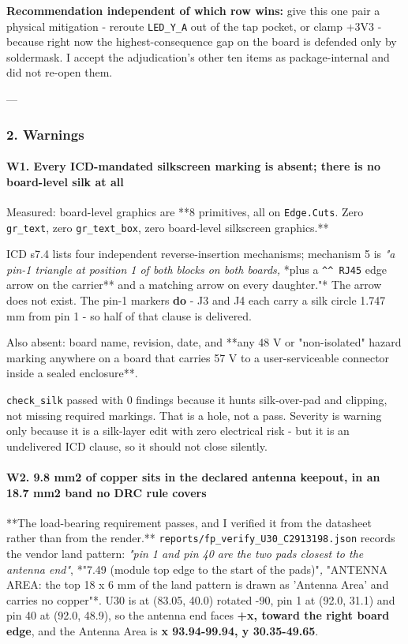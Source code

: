 \documentclass[11pt,a4paper]{article}
\begin{document}
\textbf{Recommendation independent of which row wins:} give this one pair a physical mitigation - reroute \texttt{LED\_Y\_A} out of the tap pocket, or clamp +3V3 - because right now the highest-consequence gap on the board is defended only by soldermask. I accept the adjudication's other ten items as package-internal and did not re-open them.

---

\subsubsection*{2. Warnings}
\paragraph*{W1. Every ICD-mandated silkscreen marking is absent; there is no board-level silk at all}
Measured: board-level graphics are {*}{*}8 primitives, all on \texttt{Edge.Cuts}. Zero \texttt{gr\_text}, zero \texttt{gr\_text\_box}, zero board-level silkscreen graphics.{*}{*}

ICD s7.4 lists four independent reverse-insertion mechanisms; mechanism 5 is \emph{"a pin-1 triangle at position 1 of both blocks on both boards, }{*}plus a \texttt{\textasciicircum{}\textasciicircum{} RJ45} edge arrow on the carrier{*}{*} and a matching arrow on every daughter."{*} The arrow does not exist. The pin-1 markers \textbf{do} - J3 and J4 each carry a silk circle 1.747 mm from pin 1 - so half of that clause is delivered.

Also absent: board name, revision, date, and {*}{*}any 48 V or "non-isolated" hazard marking anywhere on a board that carries 57 V to a user-serviceable connector inside a sealed enclosure{*}{*}.

\texttt{check\_silk} passed with 0 findings because it hunts silk-over-pad and clipping, not missing required markings. That is a hole, not a pass. Severity is warning only because it is a silk-layer edit with zero electrical risk - but it is an undelivered ICD clause, so it should not close silently.

\paragraph*{W2. 9.8 mm2 of copper sits in the declared antenna keepout, in an 18.7 mm2 band no DRC rule covers}
{*}{*}The load-bearing requirement passes, and I verified it from the datasheet rather than from the render.{*}{*} \texttt{reports/fp\_verify\_U30\_C2913198.json} records the vendor land pattern: \emph{"pin 1 and pin 40 are the two pads closest to the antenna end"}, {*}"7.49 (module top edge to the start of the pads)"\emph{, }"ANTENNA AREA: the top 18 x 6 mm of the land pattern is drawn as 'Antenna Area' and carries no copper"{*}. U30 is at (83.05, 40.0) rotated -90, pin 1 at (92.0, 31.1) and pin 40 at (92.0, 48.9), so the antenna end faces \textbf{+x, toward the right board edge}, and the Antenna Area is \textbf{x 93.94-99.94, y 30.35-49.65}.
\end{document}

